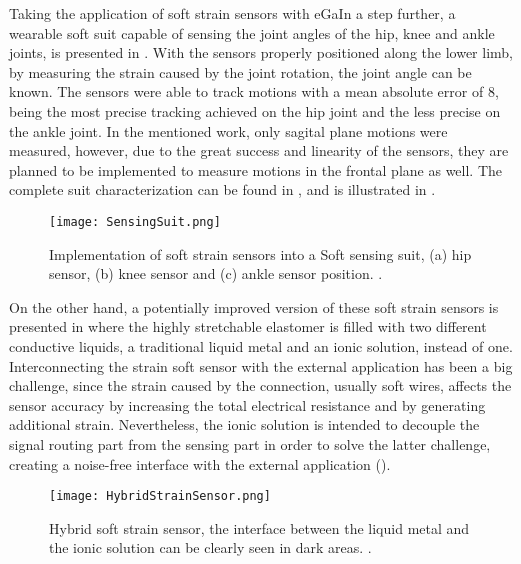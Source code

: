 Taking the application of soft strain sensors with eGaIn a step further, a wearable soft suit capable of sensing the joint angles of the hip, knee and ankle joints, is presented in \cite{mengucc2013soft}. With the sensors properly positioned along the lower limb, by measuring the strain caused by the joint rotation, the joint angle can be known. The sensors were able to track motions with a mean absolute error of 8\textdegree{}, being the most precise tracking achieved on the hip joint and the less precise on the ankle joint. In the mentioned work, only sagital plane motions were measured, however, due to the great success and linearity of the sensors, they are planned to be implemented to measure motions in the frontal plane as well. The complete suit characterization can be found in \cite{mengucc2014wearable}, and is illustrated in .

\begin{figure}[hbtp!]
    \centering
    \texttt{[image: SensingSuit.png]}
    \caption{Implementation of soft strain sensors into a Soft sensing suit, (a) hip sensor, (b) knee sensor and (c) ankle sensor position. \cite{mengucc2013soft}. }
    \label{fig:Sensing_suit}
\end{figure}

On the other hand, a potentially improved version of these soft strain sensors is presented in \cite{Chossat2013} where the highly stretchable elastomer is filled with two different conductive liquids, a traditional liquid metal and an ionic solution, instead of one. Interconnecting the strain soft sensor with the external application has been a big challenge, since the strain caused by the connection, usually soft wires, affects the sensor accuracy by increasing the total electrical resistance and by generating additional strain. Nevertheless, the ionic solution is intended to decouple the signal routing part from the sensing part in order to solve the latter challenge, creating a noise-free interface with the external application ().

\begin{figure}[hbtp!]
    \centering
    \texttt{[image: HybridStrainSensor.png]}
    \caption{Hybrid soft strain sensor, the interface between the liquid metal and the ionic solution can be clearly seen in dark areas. \cite{Chossat2013}. }
    \label{fig:hybrid_strain_sensor}
\end{figure}

